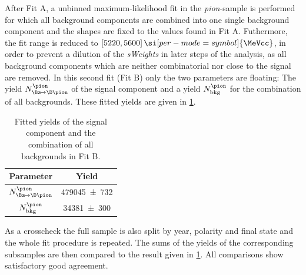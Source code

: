 After Fit A, a unbinned maximum-likelihood fit in the \emph{pion}-sample is performed for which all background components are combined into one single background component and the shapes are fixed to the values found in Fit A.
Futhermore, the fit range is reduced to $[5220, 5600]\,\si[per-mode=symbol]{\MeVcc}$, in order to prevent a dilution of the \emph{sWeights} in later steps of the analysis, as all background components which are neither combinatorial nor close to the signal are removed.
In this second fit (Fit B) only the two parameters are floating: The yield $N_{\Bz\!\to\D\pion}^{\pion}$ of the signal \BdToDpi component and a yield $N_{\text{bkg}}^{\pion}$ for the combination of all backgrounds.
These fitted yields are given in \cref{tab:fittedSignalYield}.
\begin{table}[tbp]
	\centering
	\caption{Fitted yields of the signal \BdToDpi component and the combination of all backgrounds in Fit B.}
	\begin{tabular}{cc}
		\toprule
		Parameter & Yield \\
		\midrule
		$N_{\Bz\!\to\D\pion}^{\pion}$	& \num{479045\pm732} \\
		$N_{\text{bkg}}^{\pion}$		& \num{34381\pm300} \\
		\bottomrule
	\end{tabular}
	\label{tab:fittedSignalYield}
\end{table}

As a crosscheck the full sample is also split by year, polarity and final state and the whole fit procedure is repeated.
The sums of the yields of the corresponding subsamples are then compared to the result given in \cref{tab:fittedSignalYield}.
All comparisons show satisfactory good agreement.
